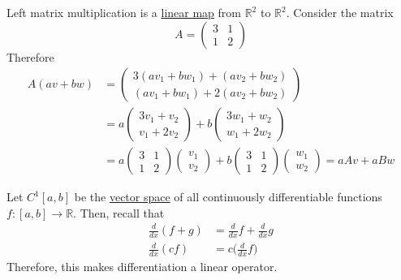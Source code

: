 	\begin{example}
	  \label{ex:left-matrix-multiplication}
		Left matrix multiplication is a \hyperref[def:linear_map]{linear map} from $\mathbb{R}^2$ to $\mathbb{R}^2$. Consider the matrix 
		\begin{equation}
			A = \begin{pmatrix} 3 & 1 \\ 1 & 2 \end{pmatrix}
		\end{equation} 
		Therefore 
		\begin{align}
			A(av + bw) & = \begin{pmatrix}
				3(a v_1 + b w_1) + (a v_2 + b w_2) \\
				(a v_1 + b w_1) + 2(a v_2 + b w_2)
			\end{pmatrix} \\ 
								 & = a \begin{pmatrix} 
				3v_1 + v_2 \\ 
				v_1 + 2 v_2 
			\end{pmatrix} + b \begin{pmatrix} 
				3w_1 + w_2 \\ 
				w_1 + 2w_2 
			\end{pmatrix} \\ 
								 & = a \begin{pmatrix} 3 & 1 \\ 1 & 2 \end{pmatrix} \begin{pmatrix} v_1 \\ v_2 \end{pmatrix} + b \begin{pmatrix} 3 & 1 \\ 1 & 2 \end{pmatrix} \begin{pmatrix} w_1 \\ w _2 \end{pmatrix} = a A v + a Bw
		\end{align}
	\end{example}

	\begin{example}[Differentiation]
	  \label{ex:differentiation}
		Let $C^1 [a, b]$ be the \hyperref[def:vector-space]{vector space} of all continuously differentiable functions $f: [a, b] \to \mathbb{R}$. Then, recall that 
		\begin{align}
			\frac{d}{dx} (f + g) & = \frac{d}{dx} f + \frac{d}{dx} g \\ 
			\frac{d}{dx} (cf) & = c \bigg( \frac{d}{dx} f \bigg)
		\end{align}
		Therefore, this makes differentiation a linear operator. 
	\end{example}


